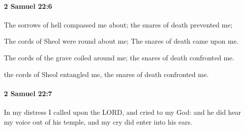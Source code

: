		\paragraph{2 Samuel 22:6} %
			\label{2SAMUEL-22-6}

			The sorrows of hell compassed me about; the snares of death prevented me;

			\begin{versebox}
					\item[BHS] 
					\item[ASV] The cords of Sheol were round about me; The snares of death came upon me.
					\item[NIV] The cords of the grave coiled around me; the snares of death confronted me.
					\item[NRSV] the cords of Sheol entangled me, the snares of death confronted me.
			\end{versebox}

		\paragraph{2 Samuel 22:7} %
			\label{2SAMUEL-22-7}

			In my distress I called upon the LORD, and cried to my God: and he did hear my voice out of his temple, and my cry did enter into his ears.

